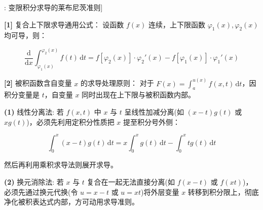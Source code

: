 \documentclass[11pt,a4paper,UTF8]{ctexart}
\begin{document}
\begin{thmbox}[公式[1]: 变限积分求导的莱布尼茨准则]

\textbf{[1]} 复合上下限求导通用公式：
设函数 $f(x)$ 连续，上下限函数 $\varphi_1(x), \varphi_2(x)$ 均可导，则：


\begin{equation*}
\frac{\mathrm{d}}{\mathrm{d}x}\int_{\varphi_1(x)}^{\varphi_2(x)} f(t)\,\mathrm{d}t = f[\varphi_2(x)]\cdot \varphi_2'(x) - f[\varphi_1(x)]\cdot \varphi_1'(x)
\end{equation*}


\textbf{[2]} 被积函数含自变量 $x$ 的求导处理原则：
对于 $F(x) = \int_a^{u(x)} f(x, t)\,\mathrm{d}t$，因积分变量是 $t$，自变量 $x$ 同时出现在上下限与被积函数内部。

\textbf{(1)}  线性分离法: 若 $f(x, t)$ 中 $x$ 与 $t$ 呈线性加减分离(如 $(x-t)g(t)$ 或 $x g(t)$)，必须先利用定积分性质把 $x$ 提至积分号外侧：


\begin{equation*}
\int_0^x (x-t)g(t)\,\mathrm{d}t = x\int_0^x g(t)\,\mathrm{d}t - \int_0^x t g(t)\,\mathrm{d}t
\end{equation*}


然后再利用乘积求导法则展开求导。

\textbf{(2)}  换元消除法: 若 $x$ 与 $t$ 复合在一起无法直接分离(如 $f(x-t)$ 或 $f(xt)$)，必须先通过换元代换(令 $u = x-t$ 或 $u = xt$)将外层变量 $x$ 转移到积分限上，彻底净化被积表达式内部，方可动用求导准则。

\end{thmbox}
\end{document}
